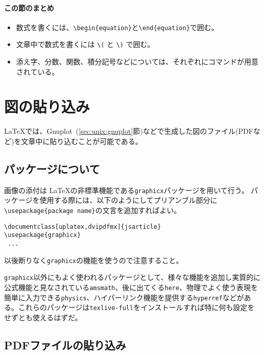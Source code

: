 \paragraph{この節のまとめ}

\begin{itemize}
    \item 数式を書くには、\verb|\begin{equation}|と\verb|\end{equation}|で囲む。
    \item 文章中で数式を書くには \texttt{\textbackslash(} と \texttt{\textbackslash)} で囲む。
    \item 添え字、分数、関数、積分記号などについては、それぞれにコマンドが用意されている。
\end{itemize}

\section{図の貼り込み}
\label{sec:latex:picture}

\LaTeX では、Gnuplot~(\ref{sec:unix:gnuplot}節)などで生成した図のファイル(PDFなど)を文章中に貼り込むことが可能である。

\subsection{パッケージについて}
\label{sec:latex:package}
画像の添付は \LaTeX の非標準機能である\texttt{graphicx}パッケージを用いて行う。
パッケージを使用する際には、以下のようにしてプリアンブル部分に\texttt{\textbackslash usepackage\{package name\}}の文言を追加すればよい。
\begin{reidai}
    \label{reidai:latex:package}
    \begin{verbatim}
\documentclass[uplatex,dvipdfmx]{jsarticle}
\usepackage{graphicx}
 ...
\end{verbatim}
\end{reidai} \noindent
以後断りなく\texttt{graphicx}の機能を使うので注意すること。

\texttt{graphicx}以外にもよく使われるパッケージとして、様々な機能を追加し実質的に公式機能と見なされている\texttt{amsmath}、後に出てくる\texttt{here}、物理でよく使う表現を簡単に入力できる\texttt{physics}、ハイパーリンク機能を提供する\texttt{hyperref}などがある。これらのパッケージは\texttt{texlive-full}をインストールすれば特に何も設定をせずとも使えるはずだ。

\subsection{PDFファイルの貼り込み}
\label{sec:latex:include_pdf}


